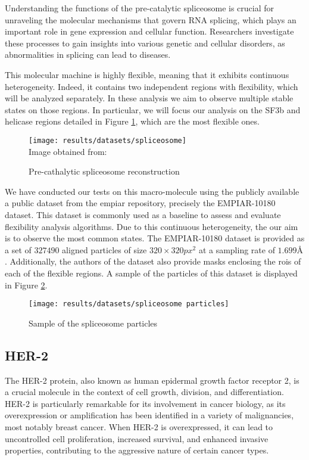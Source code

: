 \documentclass[../main.tex]{subfiles}
\begin{document}
Understanding the functions of the pre-catalytic spliceosome is crucial for unraveling the molecular mechanisms that govern RNA splicing, which plays an important role in gene expression and cellular function. Researchers investigate these processes to gain insights into various genetic and cellular disorders, as abnormalities in splicing can lead to diseases.

This molecular machine is highly flexible, meaning that it exhibits continuous heterogeneity. Indeed, it contains two independent regions with flexibility, which will be analyzed separately. In these analysis we aim to observe multiple stable states on those regions. In particular, we will focus our analysis on the SF3b and helicase regions detailed in Figure \ref{fig:5.1:spliceosome}, which are the most flexible ones. 

\begin{figure}[htbp]
    \centering
    \texttt{[image: results/datasets/spliceosome]}\\
    Image obtained from: \cite{nakane2021}
    \caption{Pre-cathalytic spliceosome reconstruction}
    \label{fig:5.1:spliceosome}
\end{figure}

We have conducted our tests on this macro-molecule using the publicly available a public dataset from the \gls{empiar} repository, precisely the EMPIAR-10180\cite{empiar10180} dataset. This dataset is commonly used as a baseline to assess and evaluate flexibility analysis algorithms\cite{herreros2021}\cite{nakane2021}\cite{herreros2023}. Due to this continuous heterogeneity, the our aim is to observe the most common states. The EMPIAR-10180 dataset is provided as a set of $327490$ aligned particles of size $320 \times 320 \si{px^2}$ at a sampling rate of $1.699 \si{\angstrom}$. Additionally, the authors of the dataset also provide masks enclosing the \glspl{roi} of each of the flexible regions. A sample of the particles of this dataset is displayed in Figure \ref{fig:5.1:spliceosome_particles}.

\begin{figure}[htbp]
    \centering
    \texttt{[image: results/datasets/spliceosome particles]}
    \caption{Sample of the spliceosome particles}
    \label{fig:5.1:spliceosome_particles}
\end{figure}

\subsection{HER-2}
The HER-2 protein, also known as human epidermal growth factor receptor 2, is a crucial molecule in the context of cell growth, division, and differentiation. HER-2 is particularly remarkable for its involvement in cancer biology, as its overexpression or amplification has been identified in a variety of malignancies, most notably breast cancer. When HER-2 is overexpressed, it can lead to uncontrolled cell proliferation, increased survival, and enhanced invasive properties, contributing to the aggressive nature of certain cancer types.
\end{document}

